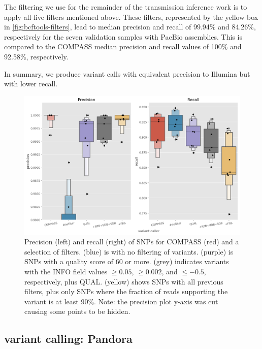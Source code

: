 The filtering we use for the remainder of the transmission inference
work is to apply all five filters mentioned above. These filters, represented by the yellow box in \autoref{fig:bcftools-filters}, lead to median precision and recall of 99.94\% and 84.26\%, respectively for the seven validation samples with PacBio assemblies. This is compared to the COMPASS median precision and recall values of 100\% and 92.58\%, respectively.

In summary, we produce \ont{} variant calls with equivalent precision to Illumina but with lower recall.

\begin{figure}
\begin{center}
\includegraphics[width=0.90\columnwidth]{Chapter2/Figs/bcftools-precision-recall-filters.png}
\caption{{Precision (left) and recall (right) of SNPs for COMPASS (red) and a selection of \bcftools{} filters.  (blue) is \bcftools{} with no filtering of variants.  (purple) is \bcftools{} SNPs with a quality score of 60 or more.  (grey) indicates \bcftools{} variants with the INFO field values $\ge 0.05$, $\ge 0.002$, and $\le -0.5$, respectively, plus QUAL.  (yellow) shows \bcftools{} SNPs with all previous filters, plus only SNPs where the fraction of reads supporting the variant is at least 90\%. Note: the precision plot y-axis was cut causing some  points to be hidden.
{\label{fig:bcftools-filters}}
}}
\end{center}
\end{figure}

\subsection{\ont{} variant calling: Pandora}
\label{sec:pandora-filters}

